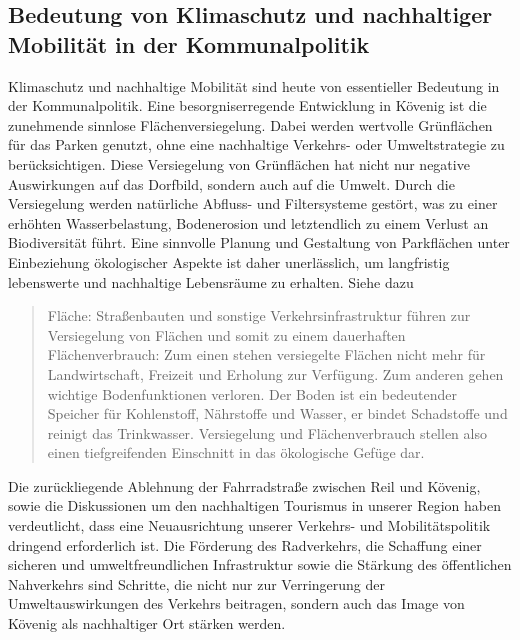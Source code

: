 	\subsection{Bedeutung von Klimaschutz und nachhaltiger Mobilität in der Kommunalpolitik}
	Klimaschutz und nachhaltige Mobilität sind heute von essentieller Bedeutung in der Kommunalpolitik. Eine besorgniserregende Entwicklung in Kövenig ist die zunehmende sinnlose Flächenversiegelung. Dabei werden wertvolle Grünflächen für das Parken genutzt, ohne eine nachhaltige Verkehrs- oder Umweltstrategie zu berücksichtigen. Diese Versiegelung von Grünflächen hat nicht nur negative Auswirkungen auf das Dorfbild, sondern auch auf die Umwelt. Durch die Versiegelung werden natürliche Abfluss- und Filtersysteme gestört, was zu einer erhöhten Wasserbelastung, Bodenerosion und letztendlich zu einem Verlust an Biodiversität führt. Eine sinnvolle Planung und Gestaltung von Parkflächen unter Einbeziehung ökologischer Aspekte ist daher unerlässlich, um langfristig lebenswerte und nachhaltige Lebensräume zu erhalten. Siehe dazu \cite{web:umweltamt:nichtinvestiv}
\blockquote{Fläche: Straßenbauten und sonstige Verkehrsinfrastruktur führen zur Versiegelung von Flächen und somit zu einem dauerhaften Flächenverbrauch: Zum einen stehen versiegelte Flächen nicht mehr für Landwirtschaft, Freizeit und Erholung zur Verfügung. Zum anderen gehen wichtige Bodenfunktionen verloren. Der Boden ist ein bedeutender Speicher für Kohlenstoff, Nährstoffe und Wasser, er bindet Schadstoffe und reinigt das Trinkwasser. Versiegelung und Flächenverbrauch stellen also einen tiefgreifenden Einschnitt in das ökologische Gefüge dar.}
Die zurückliegende Ablehnung der Fahrradstraße zwischen Reil und Kövenig, sowie die Diskussionen um den nachhaltigen Tourismus in unserer Region haben verdeutlicht, dass eine Neuausrichtung unserer Verkehrs- und Mobilitätspolitik dringend erforderlich ist. Die Förderung des Radverkehrs, die Schaffung einer sicheren und umweltfreundlichen Infrastruktur sowie die Stärkung des öffentlichen Nahverkehrs sind Schritte, die nicht nur zur Verringerung der Umweltauswirkungen des Verkehrs beitragen, sondern auch das Image von Kövenig als nachhaltiger Ort stärken werden.


